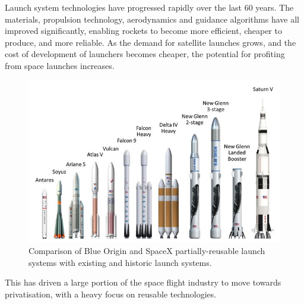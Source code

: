   Launch system technologies have progressed rapidly over the last 60 years. The materials, propulsion technology, aerodynamics and guidance algorithms have all improved significantly, enabling  rockets to become more efficient, cheaper to produce, and more reliable.          
  As the demand for satellite launches grows, and the cost of development of launchers becomes cheaper, the potential for profiting from space launches increases. 
  \begin{figure}[ht]
  	\centering
  	\includegraphics[width=0.9\linewidth]{figures/2_literature-review/LaunchVehicles}
  	\caption{Comparison of Blue Origin and SpaceX partially-reusable launch systems with existing and historic launch systems\cite{BlueOrigin}.}
  	\label{fig:LaunchVehicles}
  \end{figure}
  This has driven a large portion of the space flight industry to move towards privatisation, with a heavy focus on reusable technologies. 
         
